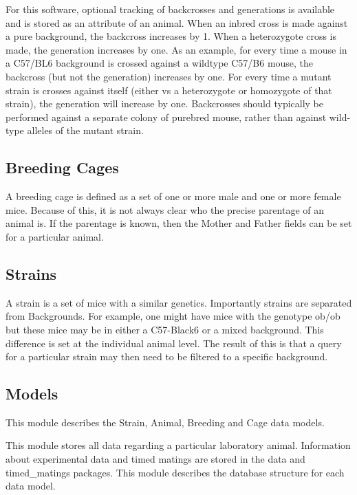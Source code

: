 \documentclass[letterpaper,10pt,english]{sphinxmanual}
\begin{document}
For this software, optional tracking of backcrosses and generations is available and is stored as an attribute of an animal.  When an inbred cross is made against a pure background, the backcross increases by 1.  When a heterozygote cross is made, the generation increases by one.  As an example, for every time a mouse in a C57/BL6 background is crossed against a wildtype C57/B6 mouse, the backcross (but not the generation) increases by one.  For every time a mutant strain is crosses against itself (either vs a heterozygote or homozygote of that strain), the generation will increase by one.  Backcrosses should typically be performed against a separate colony of purebred mouse, rather than against wild-type alleles of the mutant strain.


\subsection{Breeding Cages}

A breeding cage is defined as a set of one or more male and one or more female mice.  Because of this, it is not always clear who the precise parentage of an animal is.  If the parentage is known, then the Mother and Father fields can be set for a particular animal.


\subsection{Strains}

A strain is a set of mice with a similar genetics.  Importantly strains are separated from Backgrounds.  For example, one might have mice with the genotype ob/ob but these mice may be in either a C57-Black6 or a mixed background.  This difference is set at the individual animal level.  
The result of this is that a query for a particular strain may then need to be filtered to a specific background.


\subsection{Models}
\hypertarget{module-animal.models}{}
\modulesynopsis{}
This module describes the Strain, Animal, Breeding and Cage data models.

This module stores all data regarding a particular laboratory animal.  Information about experimental data and timed matings are stored in the data and timed\_matings packages.  This module describes the database structure for each data model.
\end{document}

